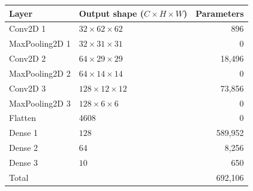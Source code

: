\begin{tabular}{llr}
\hline
Layer & Output shape ($C \times H \times W$) & Parameters \\
\hline
Conv2D 1 & $32 \times 62 \times 62$ & 896 \\
MaxPooling2D 1 & $32 \times 31 \times 31$ & 0 \\
Conv2D 2 & $64 \times 29 \times 29$ & 18{,}496 \\
MaxPooling2D 2 & $64 \times 14 \times 14$ & 0 \\
Conv2D 3 & $128 \times 12 \times 12$ & 73{,}856 \\
MaxPooling2D 3 & $128 \times 6 \times 6$ & 0 \\
Flatten & $4608$ & 0 \\
Dense 1 & $128$ & 589{,}952 \\
Dense 2 & $64$ & 8{,}256 \\
Dense 3 & $10$ & 650 \\
\hline
Total & & 692{,}106 \\
\hline
\end{tabular}
